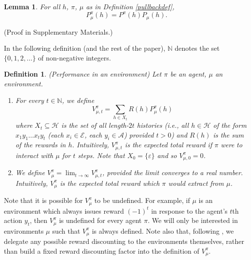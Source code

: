 \documentclass[twoside]{article}
\newtheorem{definition}[theorem]{Definition}
\newtheorem{lemma}[theorem]{Lemma}
\begin{document}
\begin{lemma}
\label{factorizationlemma}
    For all $h$, $\pi$, $\mu$ as in Definition \ref{pullbackdef},
    \[
        P^\pi_\mu(h) = P^\pi(h)P_\mu(h).
    \]
\end{lemma} %
\vspace{-0.5em}(Proof in Supplementary Materials.)


In the following definition (and the rest of the paper),
$\mathbb N$ denotes the set $\{0,1,2,\ldots\}$ of non-negative
integers.

\begin{definition}
\label{performancedefn}
    (Performance in an environment)
    Let $\pi$ be an agent, $\mu$ an environment.
    \begin{enumerate}
    \item
        For every $t\in\mathbb N$,
        we define
        \[
            V^\pi_{\mu,t}=\sum_{h\in X_t}R(h)P^\pi_\mu(h)
        \]
        where $X_t\subseteq\mathcal H$ is the set of all
        length-$2t$ histories (i.e., all $h\in\mathcal H$ of the form
        $x_1y_1\ldots x_ty_t$ (each $x_i\in\mathcal E$, each $y_i\in\mathcal A$)
        provided $t>0$) and $R(h)$ is the sum of the rewards in $h$.
        Intuitively, $V^\pi_{\mu,t}$ is the expected total reward
        if $\pi$ were to interact with $\mu$ for $t$ steps.
        Note that $X_0=\{\varepsilon\}$ and so $V^\pi_{\mu,0}=0$.
    \item
        We define $V^\pi_\mu=\lim_{t\to\infty}V^\pi_{\mu,t}$,
        provided the limit converges to a real number.
        Intuitively, $V^\pi_\mu$ is the expected total reward which $\pi$ would extract
        from $\mu$.
    \end{enumerate}
\end{definition}

Note that it is possible for $V^\pi_\mu$ to be undefined.
For example, if $\mu$ is an environment which always issues
reward $(-1)^t$ in response to the agent's $t$th action $y_t$,
then $V^\pi_\mu$ is undefined for every agent $\pi$.
We will only be interested in
environments $\mu$ such that $V^\pi_\mu$
is always defined. Note also that, following \cite{legg2007universal},
we delegate any possible reward discounting to the environments themselves,
rather than build a fixed reward discounting factor into the definition
of $V^\pi_\mu$.
\end{document}
